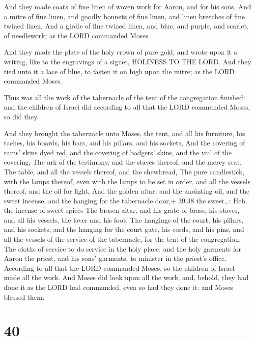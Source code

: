  And they made coats of fine linen of woven work for
Aaron, and for his sons,  And a mitre of fine linen, and
goodly bonnets of fine linen, and linen breeches of fine twined linen,
 And a girdle of fine twined linen, and blue, and purple,
and scarlet, of needlework; as the LORD commanded Moses.

 And they made the plate of the holy crown of pure gold,
and wrote upon it a writing, like to the engravings of a signet,
HOLINESS TO THE LORD.  And they tied unto it a lace of
blue, to fasten it on high upon the mitre; as the LORD commanded Moses.

 Thus was all the work of the tabernacle of the tent of
the congregation finished: and the children of Israel did according to
all that the LORD commanded Moses, so did they.

 And they brought the tabernacle unto Moses, the tent,
and all his furniture, his taches, his boards, his bars, and his
pillars, and his sockets,  And the covering of rams' skins
dyed red, and the covering of badgers' skins, and the vail of the
covering,  The ark of the testimony, and the staves
thereof, and the mercy seat,  The table, and all the
vessels thereof, and the shewbread,  The pure candlestick,
with the lamps thereof, even with the lamps to be set in order, and all
the vessels thereof, and the oil for light,  And the golden
altar, and the anointing oil, and the sweet incense, and the hanging for
the tabernacle door,+ 39.38 the sweet\ldots: Heb. the incense of sweet
spices  The brasen altar, and his grate of brass, his
staves, and all his vessels, the laver and his foot,  The
hangings of the court, his pillars, and his sockets, and the hanging for
the court gate, his cords, and his pins, and all the vessels of the
service of the tabernacle, for the tent of the congregation,
 The cloths of service to do service in the holy place, and
the holy garments for Aaron the priest, and his sons' garments, to
minister in the priest's office.  According to all that the
LORD commanded Moses, so the children of Israel made all the work.
 And Moses did look upon all the work, and, behold, they
had done it as the LORD had commanded, even so had they done it: and
Moses blessed them.

\hypertarget{section-39}{%
\section{40}\label{section-39}}

